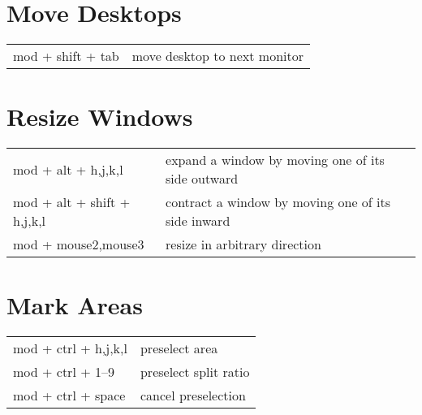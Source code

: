 \documentclass[
    10pt,
    a4paper,
    notitlepage,
    egregdoesnotlikesansseriftitles
]{scrartcl}
\begin{document}
\section{Move Desktops}
\begin{tabular}{p{4cm}l}
    mod + shift + tab     & move desktop to next monitor
\end{tabular}

\section{Resize Windows}
\begin{tabular}{p{4cm}l}
    mod + alt + h,j,k,l   & expand a window by moving one of its side outward        \\
    mod + alt + shift + h,j,k,l & contract a window by moving one of its side inward \\
    mod + mouse2,mouse3   & resize in arbitrary direction
\end{tabular}

\section{Mark Areas}
\begin{tabular}{p{4cm}l}
    mod + ctrl + h,j,k,l  & preselect area                    \\
    mod + ctrl + 1--9     & preselect split ratio            \\
    mod + ctrl + space    & cancel preselection
\end{tabular}

\end{document}
